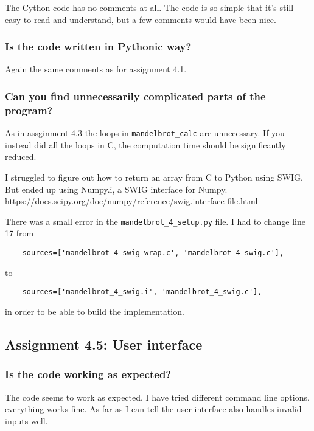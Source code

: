 \documentclass[a4paper]{article}
\begin{document}
The Cython code has no comments at all. The code is so simple that it's still easy to read and understand, but a few comments would have been nice.

\subsubsection*{Is the code written in Pythonic way?}
Again the same comments as for assignment 4.1.

\subsubsection*{Can you find unnecessarily complicated parts of the program?}

As in assginment 4.3 the loops in \texttt{mandelbrot\_calc} are unnecessary. If you instead did all the loops in C, the computation time should be significantly reduced.

I struggled to figure out how to return an array from C to Python using SWIG. But ended up using Numpy.i, a SWIG interface for Numpy. \url{https://docs.scipy.org/doc/numpy/reference/swig.interface-file.html}


There was a small error in the \texttt{mandelbrot\_4\_setup.py} file. I had to change line 17 from

\begin{verbatim}
    sources=['mandelbrot_4_swig_wrap.c', 'mandelbrot_4_swig.c'],
\end{verbatim}

to

\begin{verbatim}
    sources=['mandelbrot_4_swig.i', 'mandelbrot_4_swig.c'],
\end{verbatim}

in order to be able to build the implementation.


\subsection*{Assignment 4.5: User interface}

\subsubsection*{Is the code working as expected?}

The code seems to work as expected. I have tried different command line options, everything works fine. As far as I can tell the user interface also handles invalid inputs well.
\end{document}
